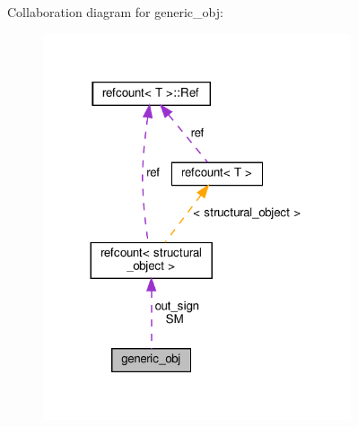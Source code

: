 Collaboration diagram for generic\+\_\+obj\+:
\nopagebreak
\begin{figure}[H]
\begin{center}
\leavevmode
\includegraphics[width=257pt]{d5/d89/classgeneric__obj__coll__graph}
\end{center}
\end{figure}
